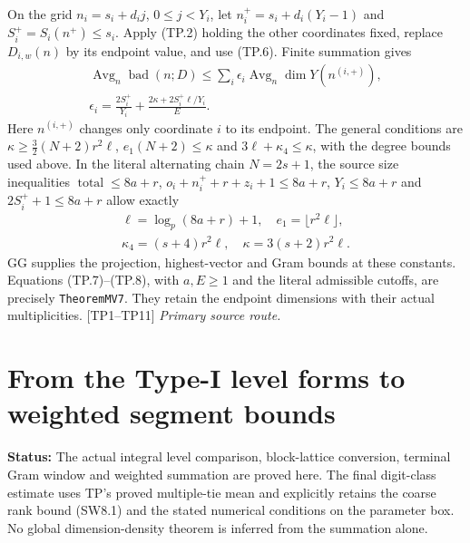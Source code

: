 \documentclass[11pt,a4paper]{article}
\numberwithin{equation}{section}
\theoremstyle{remark}\newtheorem{remark}[theorem]{Remark}
\newcommand{\status}[1]{\textbf{Status:} #1}
\begin{document}
On the grid $n_i=s_i+d_i j$, $0\le j<Y_i$, let
$n_i^+=s_i+d_i(Y_i-1)$ and $S_i^+=S_i(n^+)\le s_i$.
Apply (TP.2) holding the other coordinates fixed, replace $D_{i,w}(n)$
by its endpoint value, and use (TP.6). Finite summation gives
\[
 \boxed{\begin{gathered}
 \operatorname{Avg}_n\operatorname{bad}(n;D)
 \le\sum_i\epsilon_i\operatorname{Avg}_n\dim Y(n^{(i,+)}),\\
 \epsilon_i=\frac{2S_i^+}{Y_i}
 +\frac{2\kappa+2S_i^+\ell/Y_i}{E}.
 \end{gathered}}
 \tag{TP.7}
\]
Here $n^{(i,+)}$ changes only coordinate $i$ to its endpoint. The general
conditions are
$\kappa\ge\tfrac32(N+2)r^2\ell$, $e_1(N+2)\le\kappa$ and
$3\ell+\kappa_4\le\kappa$, with the degree bounds used above.
In the literal alternating chain $N=2s+1$, the source size inequalities
$\operatorname{total}\le8a+r$,
$o_i+n_i^++r+z_i+1\le8a+r$, $Y_i\le8a+r$ and
$2S_i^++1\le8a+r$ allow exactly
\[
 \begin{gathered}
 \ell=\log_p(8a+r)+1,\quad e_1=\lfloor r^2\ell\rfloor,
 \\\kappa_4=(s+4)r^2\ell,\quad
 \kappa=3(s+2)r^2\ell.
 \end{gathered}
 \tag{TP.8}
\]
GG supplies the projection, highest-vector and Gram bounds at these constants.
Equations (TP.7)--(TP.8), with $a,E\ge1$
and the literal admissible cutoffs, are precisely \texttt{TheoremMV7}.
They retain the endpoint dimensions with their actual multiplicities.
\textup{[TP1--TP11]}
\noindent\textit{Primary source route.}\cite{tie-partners-actual}


\section{From the Type-I level forms to weighted segment bounds}
\label{sec:segment-weighted}

\status{The actual integral level comparison, block-lattice conversion,
terminal Gram window and weighted summation are proved here.
The final digit-class estimate uses TP's proved multiple-tie mean and
explicitly retains the coarse rank bound (SW8.1) and the stated numerical
conditions on the parameter box. No global dimension-density theorem is
inferred from the summation alone.}
\end{document}

